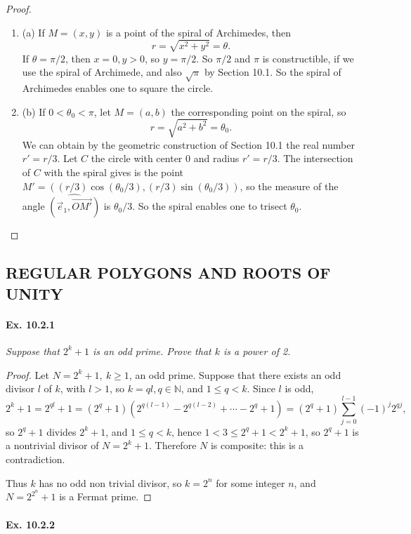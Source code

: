 \documentclass[11pt,a4paper]{article}
\newcommand{\be} {\begin{enumerate}}
\newcommand{\ee} {\end{enumerate}}
\newcommand{\N}{\mathbb{N}}
\begin{document}
\begin{proof}
\be
\item[(a)] If $M =(x,y)$ is a point of the spiral of Archimedes, then
$$r =\sqrt{x^2+y^2} = \theta.$$
If $\theta = \pi /2$, then $x = 0, y>0$, so $y = \pi/2$.
So $\pi/2$ and $\pi$ is constructible, if we use the spiral of Archimede, and also $\sqrt{\pi}$ by Section 10.1. So the spiral of Archimedes enables one to square the circle.

\item[(b)] If $0 < \theta_0 < \pi$, let $M=(a,b)$ the corresponding point on the spiral, so $$r = \sqrt{a^2+b^2} = \theta_0.$$ We can obtain by the geometric construction of Section 10.1 the real number $r' = r/3$. Let $C$ the circle with center 0 and radius $r' = r/3$. The intersection of $C$ with the spiral gives is the point $M' = ((r/3)\cos(\theta_0/3),(r/3)\sin(\theta_0/3))$, so the measure of the angle $\widehat{(\vec{e}_1,\overrightarrow{OM'})}$ is $\theta_0 /3$. So the spiral enables one to trisect $\theta_0$. 
\ee
\end{proof}

\subsection{REGULAR POLYGONS AND ROOTS OF UNITY}

\paragraph{Ex. 10.2.1}

{\it Suppose that $2^k+1$ is an odd prime. Prove that $k$ is a power of 2.
}

\begin{proof}Let $N = 2^k + 1, \ k\geq 1$, an odd prime. Suppose that there exists an odd divisor $l$ of $k$, with $l>1$, so $k = ql, q\in \N$, and $1\leq q<k$. Since $l$ is odd,
$$2^k+1 =2^{ql}+1 = (2^q + 1)(2^{q(l-1)} - 2^{q(l-2)}+ \cdots -2^q + 1) = (2^q+1)\sum_{j=0}^{l-1} (-1)^j 2^{qj},$$
so $2^q + 1$ divides $2^k+1$, and $1\leq q < k$, hence $ 1< 3 \leq 2^q + 1 < 2^k+1$, so $2^q + 1$ is a nontrivial divisor of $N = 2^k+1$. Therefore $N$ is composite: this is a contradiction.

 Thus $k$ has no odd non trivial divisor, so $k = 2^n$ for some integer $n$, and $N = 2^{2^n}+ 1$ is a Fermat prime.
\end{proof}

\paragraph{Ex. 10.2.2}
\end{document}
